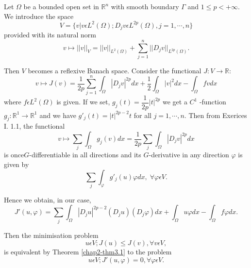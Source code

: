 \begin{example}\label{chap2-exam5.3}
Let $\Omega$ be a bounded open set in $\mathbb{R}^{n}$ with smooth boundary $\Gamma$ and $1 \leq p < + \infty$. We introduce the space
\begin{equation*}
V = \{v | v \epsilon L^{2} (\Omega) ; D_{j} v \epsilon L^{2p} (\Omega), j=1, \cdots , n\}\tag{5.31}\label{chap2-eq5.31}
\end{equation*}
provided with its natural norm
\begin{equation*}
v \mapsto ||v||_{V} = ||v||_{L^{2} (\Omega)} + \sum_{j=1}^{n} ||D_{j} v||_{L^{2p} (\Omega)}.\tag{5.32}\label{chap2-eq5.32}
\end{equation*}
\end{example}

Then $V$ becomes a reflexive Banach space. Consider the functional $J : V \to \mathbb{R}$: 
\begin{equation*}
v \mapsto J(v) = \dfrac{1}{2p} \sum_{j=1}^{n} \int_{\Omega} |D_{j} v|^{2p} dx + \frac{1}{2} \int_{\Omega} |v|^{2} dx - \int_{\Omega} fv dx\tag{5.34}\label{chap2-eq5.34}
\end{equation*}
where $f \epsilon L^{2} (\Omega)$ is given. If we set, $g_{j}(t) = \dfrac{1}{2p} |t|^{2p}$ we get a $C^{1}$ -function $g_{j} : \mathbb{R}^{1} \to \mathbb{R}^{1}$ and we have $g'_{j}(t) = |t|^{2p-2} t$ for all $j=1, \cdots , n$. Then from Exerices I. 1.1, the functional
$$
v \mapsto \sum_{j} \int_{\Omega} g_{j} (v) dx = \dfrac{1}{2p} \sum_{j} \int_{\Omega} |D_{j} v|^{2p} dx
$$
is once\pageoriginale $G$-differentiable in all directions and its $G$-derivative in any direction $\varphi$ is given by
$$
\sum_{j} \int_{\varphi} g'_{j} (u) \varphi dx, \; \forall \varphi \epsilon V.
$$

Hence we obtain, in our case,
\begin{equation*}
J'(u, \varphi) = \sum_{j} \int_{\Omega} |D_{j} u|^{2p-2} (D_{j}u) (D_{j} \varphi) dx + \int_{\Omega} u \varphi dx - \int_{\Omega} f \varphi dx.\tag{5.35}\label{chap2-eq5.35}
\end{equation*}

Then the minimisation problem
\begin{equation*}
u \epsilon V ; J(u) \leq J(v), \forall v \epsilon V,\tag{5.36}\label{chap2-eq5.36}
\end{equation*}
is equivalent by Theorem \ref{chap2-thm3.1} to the problem
\begin{equation*}
u \epsilon V; J' (u, \varphi) = 0, \forall \varphi \epsilon V.\tag{5.37}\label{chap2-eq5.37}
\end{equation*}

